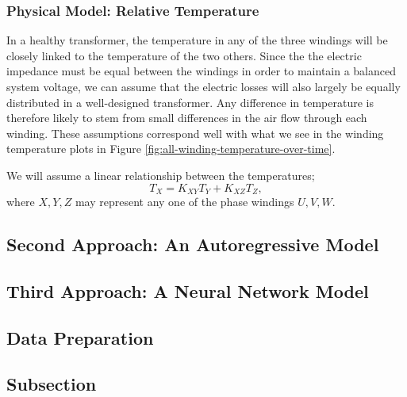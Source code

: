 \documentclass[]{article}
\begin{document}
\subsubsection{Physical Model: Relative Temperature} \label{sec:physical-model-relative}
In a healthy transformer, the temperature in any of the three windings will be closely linked to the temperature of the two others. Since the the electric impedance must be equal between the windings in order to maintain a balanced system voltage, we can assume that the electric losses will also largely be equally distributed in a well-designed transformer. Any difference in temperature is therefore likely to stem from small differences in the air flow through each winding. These assumptions correspond well with what we see in the winding temperature plots in Figure \ref{fig:all-winding-temperature-over-time}.

We will assume a linear relationship between the temperatures;
\begin{equation}
	T_X = K_{XY} T_Y + K_{XZ} T_Z,
\end{equation}
where $X,Y,Z$ may represent any one of the phase windings $U,V,W$. 

\subsection{Second Approach: An Autoregressive Model} \label{sec:autoregressive-model}

\subsection{Third Approach: A Neural Network Model} \label{sec:neural-model}

\subsection{Data Preparation} \label{sec:data-prep}



\subsection{Subsection} \label{sec:subsection-name}




\end{document}
